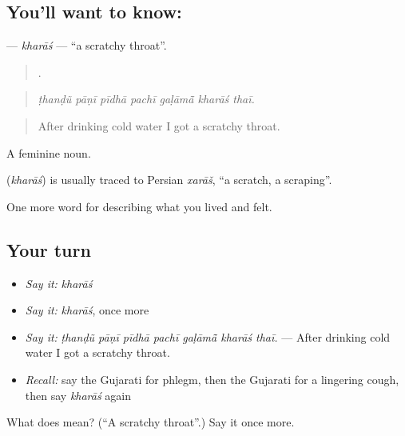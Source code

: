 \subsection*{You'll want to know: }
\textbf{} — \emph{kharāś} — \textquotedblleft{}a scratchy throat\textquotedblright{}.

\begin{quote}
      .
\end{quote}

\begin{quote}
\emph{ṭhanḍũ pāṇī pīdhā pachī gaḷāmā̃ kharāś thaī.}
\end{quote}

\begin{quote}
After drinking cold water I got a scratchy throat.
\end{quote}

A feminine noun.

\begin{cousinweb}
\textbf{} (\emph{kharāś}) is usually traced to Persian \emph{xarāš}, \textquotedblleft{}a scratch, a scraping\textquotedblright{}.
\end{cousinweb}

\begin{grammarlens}[title={What you've built}]
One more word for describing what you lived and felt.
\end{grammarlens}

\subsection*{Your turn}
\begin{itemize}
\raggedright
  \item \emph{Say it:} \emph{kharāś}
  \item \emph{Say it:} \emph{kharāś}, once more
  \item \emph{Say it:} \emph{ṭhanḍũ pāṇī pīdhā pachī gaḷāmā̃ kharāś thaī.} — After drinking cold water I got a scratchy throat.
  \item \emph{Recall:} say the Gujarati for phlegm, then the Gujarati for a lingering cough, then say \emph{kharāś} again
\end{itemize}

\begin{tcolorbox}[breakable,colback=teal!4,colframe=teal!35!black,title={Before you move on}]
What does  mean? (\textquotedblleft{}A scratchy throat\textquotedblright{}.) Say it once more.
\end{tcolorbox}

